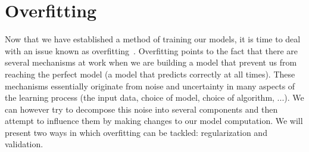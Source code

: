 \section{Overfitting}
\label{sec:glm-overfitting}
Now that we have established a method of training our models, it is time to deal with an issue known as overfitting~\cite{caltechmachinelearning}\cite{babyak2004you}. Overfitting points to the fact that there are several mechanisms at work when we are building a model that prevent us from reaching the perfect model (a model that predicts correctly at all times). These mechanisms essentially originate from noise and uncertainty in many aspects of the learning process (the input data, choice of model, choice of algorithm, ...). We can however try to decompose this noise into several components and then attempt to influence them by making changes to our model computation. We will present two ways in which overfitting can be tackled: regularization and validation.


